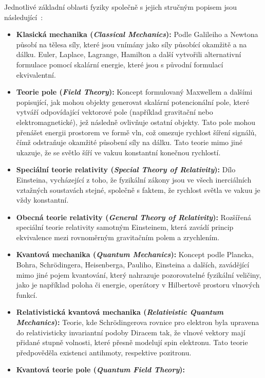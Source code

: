 Jednotlivé základní oblasti fyziky společně s jejich stručným popisem jsou následující~\cite{NaturalComputing}:
\begin{itemize}
    \item \textbf{Klasická mechanika (\emph{Classical Mechanics}):} 
    Podle Galileiho a Newtona působí na tělesa síly, které jsou vnímány jako síly působící okamžitě a na dálku. 
    Euler, Laplace, Lagrange, Hamilton a další vytvořili alternativní formulace pomocí skalární energie, které jsou s původní formulací ekvivalentní. 
    \item \textbf{Teorie pole (\emph{Field Theory}):} 
    Koncept formulovaný Maxwellem a dalšími popisující, jak mohou objekty generovat skalární potencionální pole, které vytváří odpovídající vektorové pole (například gravitační nebo elektromagnetické), jež následně ovlivňuje ostatní objekty. 
    Tato pole mohou přenášet energii prostorem ve formě vln, což omezuje rychlost šíření signálů, čímž odstraňuje okamžité působení síly na dálku. 
    Tato teorie mimo jiné ukazuje, že se světlo šíří ve vakuu konstantní konečnou rychlostí. 
    \item \textbf{Speciální teorie relativity (\emph{Special Theory of Relativity}):} 
    Dílo Einsteina, vycházející z toho, že fyzikální zákony jsou ve všech inerciálních vztažných soustavách stejné, společně s faktem, že rychlost světla ve vakuu je vždy konstantní.
    \item \textbf{Obecná teorie relativity (\emph{General Theory of Relativity}):} 
    Rozšířená speciální teorie relativity samotným Einsteinem, která zavádí princip ekvivalence mezi rovnoměrným gravitačním polem a zrychlením. 
    \item \textbf{Kvantová mechanika (\emph{Quantum Mechanics}):} 
    Koncept podle Plancka, Bohra, Schrö\-din\-ge\-ra, Heisenberga, Pauliho, Einsteina a dalších, zavádějící mimo jiné pojem kvantování, který nahrazuje pozorovatelné fyzikální veličiny, jako je například poloha či energie, operátory v Hilbertově prostoru vlnových funkcí.
    \item \textbf{Relativistická kvantová mechanika (\emph{Relativistic Quantum Mechanics}):} 
    Teorie, kde Schrödingerova rovnice pro elektron byla upravena do relativisticky invariantní podoby Diracem tak, že vlnové vektory mají přidané stupně volnosti, které přesně modelují spin elektronu. 
    Tato teorie předpověděla existenci antihmoty, respektive pozitronu. 
    \item \textbf{Kvantová teorie pole (\emph{Quantum Field Theory}):} 

\end{itemize}
